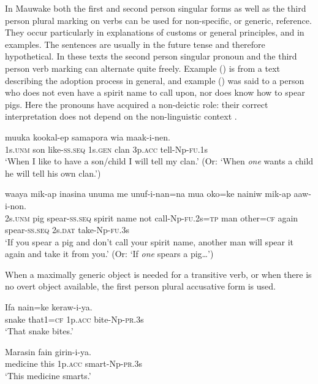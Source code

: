 In Mauwake both the first and second person singular forms as well as the third person plural marking on verbs can be used for non-specific, or generic, reference. They occur particularly in explanations of customs or general principles, and in examples. The sentences are usually in the future tense and therefore hypothetical. In these texts the second person singular pronoun and the third person verb marking can alternate quite freely. Example () is from a text describing the adoption process in general, and example () was said to a person who does not even have a spirit name to call upon, nor does know how to spear pigs. Here the pronouns have acquired a non-deictic role: their correct interpretation does not depend on the non-linguistic context \citep[260]{AndersonEtAl1985}%
.

\ea%
\label{ex:x621}
\gll {} muuka kookal-ep  samapora wia maak-i-nen.\\
1s.\textsc{unm} son like-\textsc{ss}.\textsc{seq} 1s.\textsc{gen} clan 3p.\textsc{acc} tell-Np-\textsc{fu}.1s\\
\glt`When I like to have a son/child I will tell my clan.' (Or: `When \textit{one} wants a child he will tell his own clan.')
\z

\ea%
\label{ex:x622}
\gll {} waaya mik-ap inasina unuma me unuf-i-nan=na mua oko=ke nainiw mik-ap  aaw-i-non.\\
2s.\textsc{unm} pig spear-\textsc{ss}.\textsc{seq} spirit name not call-Np-\textsc{fu}.2s=\textsc{tp} man other=\textsc{cf} again spear-\textsc{ss}.\textsc{seq} 2s.\textsc{dat} take-Np-\textsc{fu}.3s\\
\glt`If you spear a pig and don't call your spirit name, another man will spear it again and take it from you.' (Or: `If \textit{one} spears a pig{\dots}')
\z

When a maximally generic object is needed for a transitive verb, or when there is no overt object available, the first person plural accusative form is used. 

\ea%
\label{ex:x623}
\gll Ifa nain=ke  keraw-i-ya. \\
snake that1=\textsc{cf} 1p.\textsc{acc} bite-Np-\textsc{pr}.3s\\
\glt`That snake bites.'
\z

\ea%
\label{ex:x624}
\gll Marasin fain  girin-i-ya. \\
medicine this 1p.\textsc{acc} smart-Np-\textsc{pr}.3s\\
\glt`This medicine smarts.'
\z

